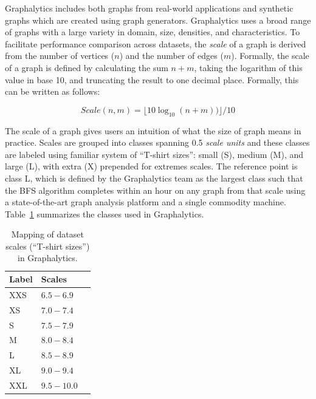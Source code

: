 Graphalytics includes both graphs from real-world applications and synthetic graphs which are created using graph generators. Graphalytics uses a broad range of graphs with a large variety in domain, size, densities, and characteristics. To facilitate performance comparison across datasets, the \emph{scale} of a graph is derived from the number of vertices ($n$) and the number of edges ($m$). Formally, the scale of a graph is defined by calculating the sum $n + m$, taking the logarithm of this value in base 10, and truncating the result to one decimal place. Formally, this can be written as follows:

\begin{equation}
Scale(n, m) = \lfloor 10 \log_{10}(n + m)) \rfloor / 10
\end{equation}

The scale of a graph gives users an intuition of what the size of graph means in practice. Scales are grouped into classes spanning 0.5 \emph{scale units} and these classes are labeled using familiar system of ``T-shirt sizes'': small (S), medium (M), and large (L), with extra (X) prepended for extremes scales. The reference point is class L, which is defined by the Graphalytics team as the largest class such that the BFS algorithm completes within an hour on any graph from that scale using a state-of-the-art graph analysis platform and a single commodity machine. Table~\ref{tab:definition_scales} summarizes the classes used in Graphalytics.


\begin{table}
\caption{Mapping of dataset scales (``T-shirt sizes'') in Graphalytics.}
\label{tab:definition_scales}

\centering
\begin{tabular}{|l||l|l|}
\hline
\textbf{Label} & \textbf{Scales} \\ %
\hline \hline
XXS & $6.5 - 6.9$ %
\\ \hline
XS & $7.0 - 7.4$ %
\\ \hline
S & $7.5-7.9$ %
 \\ \hline
M & $8.0 - 8.4$ %
\\ \hline
L & $8.5 - 8.9$ %
\\ \hline
XL & $9.0 - 9.4$ %
 \\ \hline
XXL & $9.5 - 10.0$ %
\\ \hline
\end{tabular}
\end{table}


